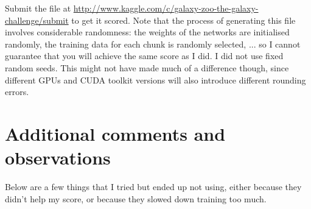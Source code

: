 \documentclass[a4paper,10pt]{article}
\begin{document}
Submit the file  at \url{http://www.kaggle.com/c/galaxy-zoo-the-galaxy-challenge/submit} to get it scored. Note that the process of generating this file involves considerable randomness: the weights of the networks are initialised randomly, the training data for each chunk is randomly selected, ... so I cannot guarantee that you will achieve the same score as I did. I did not use fixed random seeds. This might not have made much of a difference though, since different GPUs and CUDA toolkit versions will also introduce different rounding errors.

\section{Additional comments and observations}

Below are a few things that I tried but ended up not using, either because they didn't help my score, or because they slowed down training too much.
\end{document}
